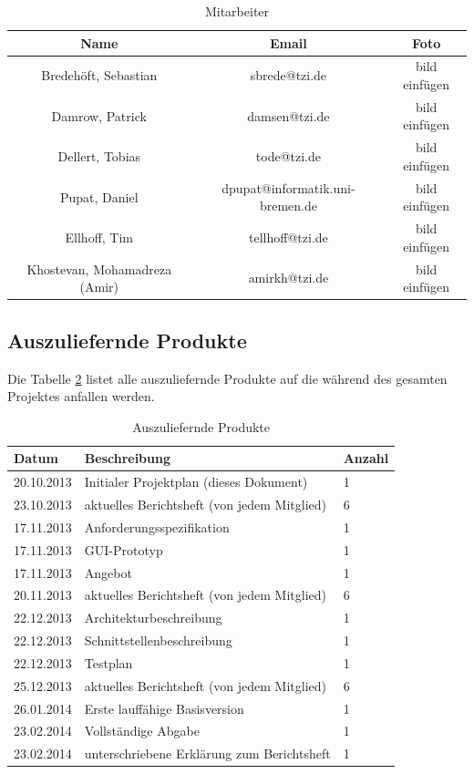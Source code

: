 \documentclass[fontsize=12pt,paper=a4,twoside]{scrartcl}
\begin{document}
\begin{table}[htbp]
\caption{Mitarbeiter}
\label{tableMitarbeiter}
\begin{tabular}{|c|c|c|}
\hline 
\textbf{Name} & \textbf{Email} & \textbf{Foto}\\ \hline \hline
Bredehöft, Sebastian & sbrede@tzi.de & bild einfügen \\ \hline
Damrow, Patrick & damsen@tzi.de & bild einfügen\\ \hline
Dellert, Tobias & tode@tzi.de & bild einfügen\\\hline
Pupat, Daniel & dpupat@informatik.uni-bremen.de & bild einfügen \\ \hline
Ellhoff, Tim & tellhoff@tzi.de & bild einfügen\\ \hline
Khostevan, Mohamadreza (Amir) & amirkh@tzi.de & bild einfügen \\ \hline
\end{tabular}
\end{table}

\newpage

\subsection{Auszuliefernde Produkte\\}

Die Tabelle \ref{reqProd} listet alle auszuliefernde Produkte auf die während des gesamten Projektes anfallen werden.

\begin{table}[htbp]
\caption{Auszuliefernde Produkte}
\label{reqProd}
\centering
\begin{tabular}{|p{4cm}|p{8cm}|p{2cm}|}
\hline Datum & Beschreibung & Anzahl\\ \hline
\hline 20.10.2013 & Initialer Projektplan (dieses Dokument) & 1\\
\hline 23.10.2013 & aktuelles Berichtsheft (von jedem Mitglied) & 6\\
\hline 17.11.2013 & Anforderungsspezifikation & 1\\
\hline 17.11.2013 & GUI-Prototyp & 1\\
\hline 17.11.2013 & Angebot & 1\\
\hline 20.11.2013 & aktuelles Berichtsheft (von jedem Mitglied) & 6\\
\hline 22.12.2013 & Architekturbeschreibung & 1\\
\hline 22.12.2013 & Schnittstellenbeschreibung & 1\\
\hline 22.12.2013 & Testplan & 1\\
\hline 25.12.2013 & aktuelles Berichtsheft (von jedem Mitglied) & 6\\
\hline 26.01.2014 & Erste lauffähige Basisversion & 1\\
\hline 23.02.2014 & Vollständige Abgabe & 1\\
\hline 23.02.2014 & unterschriebene Erklärung zum Berichtsheft & 1\\
\hline 
\end{tabular}
\end{table}
\end{document}
